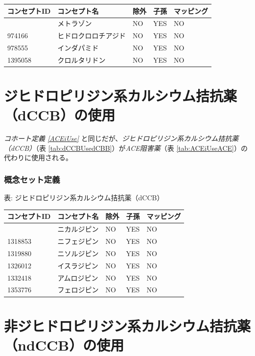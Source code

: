 \documentclass[
  11pt]{book}
\theoremstyle{definition}
\theoremstyle{definition}
\theoremstyle{definition}
\theoremstyle{definition}
\theoremstyle{remark}
\begin{document}
\begin{longtable}[]{@{}lllll@{}}
\toprule\noalign{}
コンセプトID & コンセプト名 & 除外 & 子孫 & マッピング \\
\midrule\noalign{}
\endhead
\bottomrule\noalign{}
\endlastfoot
907013 & メトラゾン & NO & YES & NO \\
974166 & ヒドロクロロチアジド & NO & YES & NO \\
978555 & インダパミド & NO & YES & NO \\
1395058 & クロルタリドン & NO & YES & NO \\
\end{longtable}

\section{ジヒドロピリジン系カルシウム拮抗薬（dCCB）の使用}\label{dCCBUse}

\emph{コホート定義 \ref{ACEiUse}} と同じだが、\emph{ジヒドロピリジン系カルシウム拮抗薬（dCCB）}（表 \ref{tab:dCCBUsedCBB}）が\emph{ACE阻害薬}（表 \ref{tab:ACEiUseACE}）の代わりに使用される。

\subsubsection*{概念セット定義}\label{ux6982ux5ff5ux30bbux30c3ux30c8ux5b9aux7fa9-4}

表: \label{tab:dCCBUsedCBB} ジヒドロピリジン系カルシウム拮抗薬（dCCB）

\begin{longtable}[]{@{}lllll@{}}
\toprule\noalign{}
コンセプトID & コンセプト名 & 除外 & 子孫 & マッピング \\
\midrule\noalign{}
\endhead
\bottomrule\noalign{}
\endlastfoot
1318137 & ニカルジピン & NO & YES & NO \\
1318853 & ニフェジピン & NO & YES & NO \\
1319880 & ニソルジピン & NO & YES & NO \\
1326012 & イスラジピン & NO & YES & NO \\
1332418 & アムロジピン & NO & YES & NO \\
1353776 & フェロジピン & NO & YES & NO \\
\end{longtable}

\section{非ジヒドロピリジン系カルシウム拮抗薬（ndCCB）の使用}\label{ndCCBUse}
\end{document}
